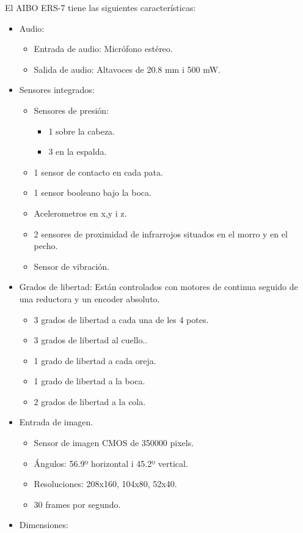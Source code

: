 \documentclass[12pt,a4paper,final,twoside]{book}
\begin{document}
El AIBO ERS-7 tiene las siguientes características: 

\begin{itemize}
\item Audio:
\begin{itemize}
\item Entrada de audio: Micrófono estéreo.
\item Salida de audio: Altavoces de 20.8 mm i 500 mW.
\end{itemize}
\item Sensores integrados:
\begin{itemize}
\item Sensores de presión:
\begin{itemize}
\item 1 sobre la cabeza.
\item 3 en la espalda.
\end{itemize}
\item 1 sensor de contacto en cada pata. 
\item 1 sensor booleano bajo la boca.
\item Acelerometros en x,y i z.
\item 2 sensores de proximidad de infrarrojos situados en el morro y en el pecho.
\item Sensor de vibración.
\end{itemize}
\item Grados de libertad: Están controlados con motores de continua seguido de una reductora y un encoder absoluto.
\begin{itemize}
\item 3 grados de libertad a cada una de les 4 potes.
\item 3 grados de libertad al cuello..
\item 1 grado de libertad a cada oreja.
\item 1 grado de libertad a la boca.
\item 2 grados de libertad a la cola. 
\end{itemize}
\item Entrada de imagen.
\begin{itemize}
\item Sensor de imagen CMOS de 350000 pixels.
\item Ángulos: 56.9º horizontal i 45.2º vertical.
\item Resoluciones: 208x160, 104x80, 52x40.
\item 30 frames por segundo.
\end{itemize}
\item Dimensiones:

\end{itemize}
\end{document}
